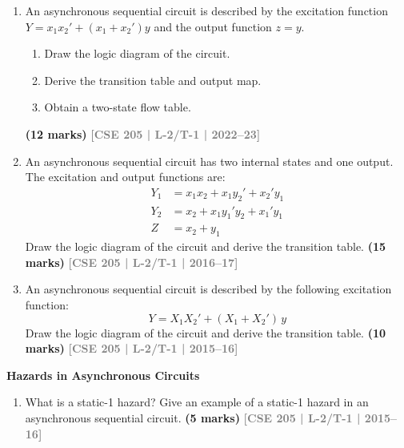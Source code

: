 \documentclass[12pt,a3paper]{article}
\newcommand{\yr}[1]{\hfill\textcolor{gray}{\small\textbf{[#1]}}}
\newcommand{\mk}[1]{\textcolor{orange!70!black}{\small\textbf{(#1 marks)}}}
\newcommand{\subtopic}[2]{%
  \vspace{10pt}
  \noindent\begin{tcolorbox}[colback=#1!8,colframe=#1,boxrule=0.6pt,arc=4pt,
    left=6pt,right=6pt,top=4pt,bottom=4pt]
    \small\bfseries\textcolor{#1}{#2}
  \end{tcolorbox}
  \vspace{2pt}
}
\begin{document}
\begin{enumerate}

\item An asynchronous sequential circuit is described by the excitation function $Y = x_1x_2' + (x_1 + x_2')y$ and the output function $z = y$.
\begin{enumerate}
  \item Draw the logic diagram of the circuit.
  \item Derive the transition table and output map.
  \item Obtain a two-state flow table.
\end{enumerate}
\mk{12} \yr{CSE 205 | L-2/T-1 | 2022--23}

\item An asynchronous sequential circuit has two internal states and one output. The excitation and output functions are:
\begin{align*}
  Y_1 &= x_1 x_2 + x_1 y_2' + x_2' y_1 \\
  Y_2 &= x_2 + x_1 y_1' y_2 + x_1' y_1 \\
  Z   &= x_2 + y_1
\end{align*}
Draw the logic diagram of the circuit and derive the transition table.
\mk{15} \yr{CSE 205 | L-2/T-1 | 2016--17}

\item An asynchronous sequential circuit is described by the following excitation function:
\[ Y = X_1 X_2' + (X_1 + X_2')\,y \]
Draw the logic diagram of the circuit and derive the transition table.
\mk{10} \yr{CSE 205 | L-2/T-1 | 2015--16}


\end{enumerate}

\subtopic{cF}{Hazards in Asynchronous Circuits}
\label{sub:s6-hazards}

\begin{enumerate}

\item What is a static-1 hazard? Give an example of a static-1 hazard in an asynchronous sequential circuit.
\mk{5} \yr{CSE 205 | L-2/T-1 | 2015--16}

\end{enumerate}
\end{document}
